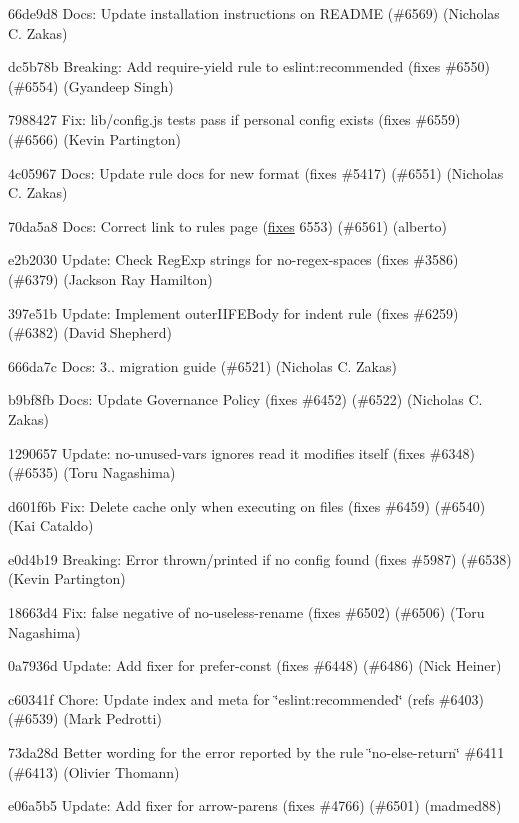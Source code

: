 \begin{DoxyItemize}
\item 66de9d8 Docs\+: Update installation instructions on R\+E\+A\+D\+ME (\#6569) (Nicholas C. Zakas)
\item dc5b78b Breaking\+: Add {\ttfamily require-\/yield} rule to {\ttfamily eslint\+:recommended} (fixes \#6550) (\#6554) (Gyandeep Singh)
\item 7988427 Fix\+: lib/config.\+js tests pass if personal config exists (fixes \#6559) (\#6566) (Kevin Partington)
\item 4c05967 Docs\+: Update rule docs for new format (fixes \#5417) (\#6551) (Nicholas C. Zakas)
\item 70da5a8 Docs\+: Correct link to rules page (\mbox{\hyperlink{classfixes}{fixes}} 6553) (\#6561) (alberto)
\item e2b2030 Update\+: Check Reg\+Exp strings for {\ttfamily no-\/regex-\/spaces} (fixes \#3586) (\#6379) (Jackson Ray Hamilton)
\item 397e51b Update\+: Implement outer\+I\+I\+F\+E\+Body for indent rule (fixes \#6259) (\#6382) (David Shepherd)
\item 666da7c Docs\+: 3.. migration guide (\#6521) (Nicholas C. Zakas)
\item b9bf8fb Docs\+: Update Governance Policy (fixes \#6452) (\#6522) (Nicholas C. Zakas)
\item 1290657 Update\+: {\ttfamily no-\/unused-\/vars} ignores read it modifies itself (fixes \#6348) (\#6535) (Toru Nagashima)
\item d601f6b Fix\+: Delete cache only when executing on files (fixes \#6459) (\#6540) (Kai Cataldo)
\item e0d4b19 Breaking\+: Error thrown/printed if no config found (fixes \#5987) (\#6538) (Kevin Partington)
\item 18663d4 Fix\+: false negative of {\ttfamily no-\/useless-\/rename} (fixes \#6502) (\#6506) (Toru Nagashima)
\item 0a7936d Update\+: Add fixer for prefer-\/const (fixes \#6448) (\#6486) (Nick Heiner)
\item c60341f Chore\+: Update index and {\ttfamily meta} for {\ttfamily \char`\"{}eslint\+:recommended\char`\"{}} (refs \#6403) (\#6539) (Mark Pedrotti)
\item 73da28d Better wording for the error reported by the rule \char`\"{}no-\/else-\/return\char`\"{} \#6411 (\#6413) (Olivier Thomann)
\item e06a5b5 Update\+: Add fixer for arrow-\/parens (fixes \#4766) (\#6501) (madmed88)

\end{DoxyItemize}
